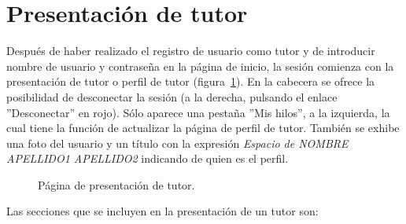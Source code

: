 \documentclass[a4paper, 12pt]{book}
\begin{document}
\section{Presentaci\'on de tutor}
\label{app:presentaciontutor}
Despu\'es de haber realizado el registro de usuario como tutor y de introducir nombre de usuario y contrase\~na en la p\'agina de inicio, la sesi\'on 
comienza con la presentaci\'on de tutor o perfil de tutor (figura~\ref{figura:tutor}). En la cabecera se ofrece la posibilidad de desconectar la sesi\'on (a la derecha, pulsando el 
enlace ''Desconectar'' en rojo). S\'olo aparece una pesta\~na ''Mis hilos'', a la izquierda, la cual tiene la funci\'on de actualizar la p\'agina de perfil 
de tutor. Tambi\'en se exhibe una foto del usuario y un t\'itulo con la expresi\'on \textit{Espacio de NOMBRE APELLIDO1 APELLIDO2} indicando de quien es el
perfil.

\begin{figure}[htbp] 
  \centering
  \caption{P\'agina de presentaci\'on de tutor.}
  \label{figura:tutor}
\end{figure}

Las secciones que se incluyen en la presentaci\'on de un tutor son:
\end{document}
